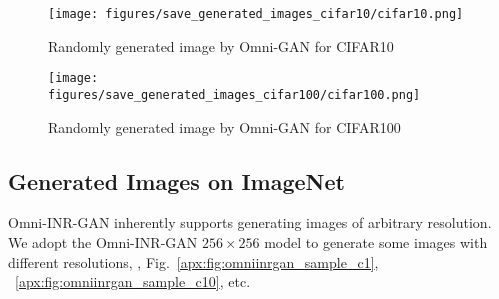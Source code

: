 \documentclass[paper_2425.tex]{subfiles}
\begin{document}
\begin{figure}[t]
  \centering
\texttt{[image: figures/save\_generated\_images\_cifar10/cifar10.png]}
\caption{Randomly generated image by Omni-GAN for CIFAR10}
  \label{apx:fig:cifar10}
\end{figure}

\begin{figure}[t]
  \centering
\texttt{[image: figures/save\_generated\_images\_cifar100/cifar100.png]}
\caption{Randomly generated image by Omni-GAN for CIFAR100}
  \label{apx:fig:cifar100}
\end{figure}





\subsection{Generated Images on ImageNet}

Omni-INR-GAN inherently supports generating images of arbitrary resolution. We adopt the Omni-INR-GAN $256\times256$ model to generate some images with different resolutions, \eg, Fig.~\ref{apx:fig:omniinrgan_sample_c1}, ~\ref{apx:fig:omniinrgan_sample_c10}, etc.



\begin{figure*}[t]
  \footnotesize
  \centering
  \renewcommand{\tabcolsep}{1pt} \renewcommand{\arraystretch}{0.8}
  \graphicspath{{figures/results/OmniINGAN_samples/class_0001_20210324_113415_932/}}
  \vspace{-5pt}
  \caption{Samples generated by our Omni-INR-GAN $256\times256$ model. Omni-INR-GAN has the ability to generate images of any resolution.}
  \label{apx:fig:omniinrgan_sample_c1}
  \vspace{-5pt}
\end{figure*}
\end{document}

